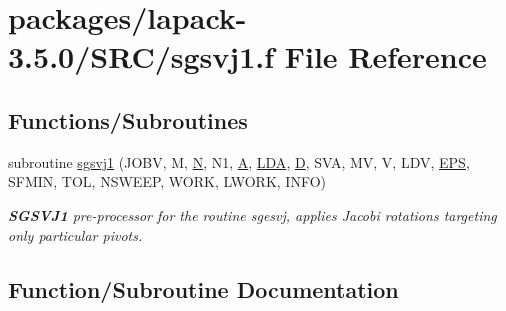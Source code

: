 \hypertarget{sgsvj1_8f}{}\section{packages/lapack-\/3.5.0/\+S\+R\+C/sgsvj1.f File Reference}
\label{sgsvj1_8f}
\subsection*{Functions/\+Subroutines}
\begin{DoxyCompactItemize}
\item 
subroutine \hyperlink{sgsvj1_8f_a6f84cb1058d270d2142f738950603081}{sgsvj1} (J\+O\+B\+V, M, \hyperlink{polmisc_8c_a0240ac851181b84ac374872dc5434ee4}{N}, N1, \hyperlink{classA}{A}, \hyperlink{example__user_8c_ae946da542ce0db94dced19b2ecefd1aa}{L\+D\+A}, \hyperlink{odrpack_8h_a7dae6ea403d00f3687f24a874e67d139}{D}, S\+V\+A, M\+V, V, L\+D\+V, \hyperlink{tukey_8c_a6ebf6899d6c1c8b7b9d09be872c05aae}{E\+P\+S}, S\+F\+M\+I\+N, T\+O\+L, N\+S\+W\+E\+E\+P, W\+O\+R\+K, L\+W\+O\+R\+K, I\+N\+F\+O)
\begin{DoxyCompactList}\small\item\em {\bfseries S\+G\+S\+V\+J1} pre-\/processor for the routine sgesvj, applies Jacobi rotations targeting only particular pivots. \end{DoxyCompactList}\end{DoxyCompactItemize}


\subsection{Function/\+Subroutine Documentation}
\hypertarget{sgsvj1_8f_a6f84cb1058d270d2142f738950603081}{}
